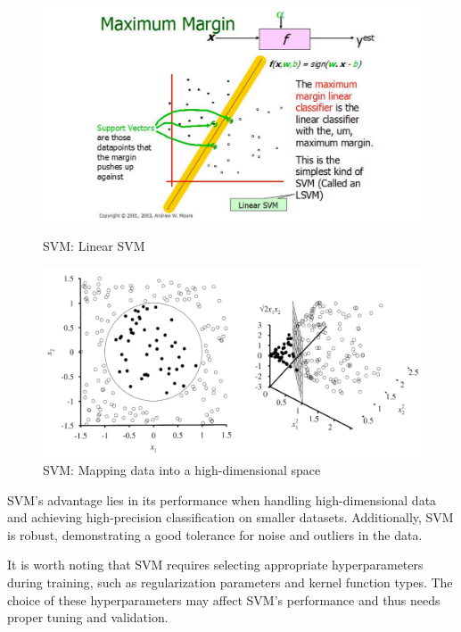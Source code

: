 \documentclass[a4paper]{article}
\begin{document}
\begin{figure}[H]
    \centering
    \begin{minipage}{0.48\textwidth}
      \centering
      \includegraphics[width=\linewidth]{./images/SVM_Linear SVM.png}
      \caption{SVM: Linear SVM}
      \label{fig.SVM_Linear SVM[Illustration of Linear SVM. (Taken from Andrew W. Moore slides 2003)]}
    \end{minipage}\hfill
    \begin{minipage}{0.48\textwidth}
      \centering
      \includegraphics[width=\linewidth]{./images/SVM_High-dimensional_Space.png}
      \caption{SVM: Mapping data into a high-dimensional space}
      \label{fig.SVM_High-dimensional_Space[SVMTutorial]}
    \end{minipage}
  \end{figure}

SVM's advantage lies in its performance when handling high-dimensional data and achieving high-precision classification on smaller datasets. Additionally, SVM is robust, demonstrating a good tolerance for noise and outliers in the data.

It is worth noting that SVM requires selecting appropriate hyperparameters during training, such as regularization parameters and kernel function types. The choice of these hyperparameters may affect SVM's performance and thus needs proper tuning and validation.
\end{document}
